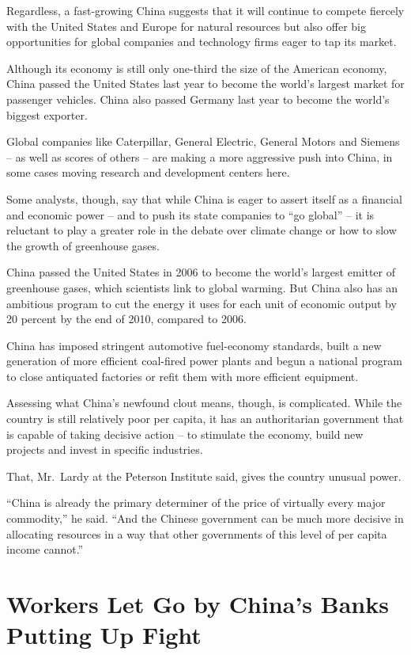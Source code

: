 ﻿\documentclass[12pt]{article}
\begin{document}
Regardless, a fast-growing China suggests that it will continue to compete fiercely with the United
States and Europe for natural resources but also offer big opportunities for global companies and
technology firms eager to tap its market.

Although its economy is still only one-third the size of the American economy, China passed the
United States last year to become the world's largest market for passenger vehicles. China also
passed Germany last year to become the world's biggest exporter.

Global companies like Caterpillar, General Electric, General Motors and Siemens -- as well as scores
of others -- are making a more aggressive push into China, in some cases moving research and
development centers here.

Some analysts, though, say that while China is eager to assert itself as a financial and economic
power -- and to push its state companies to ``go global'' -- it is reluctant to play a greater role
in the debate over climate change or how to slow the growth of greenhouse gases.

China passed the United States in 2006 to become the world's largest emitter of greenhouse gases,
which scientists link to global warming. But China also has an ambitious program to cut the energy
it uses for each unit of economic output by 20 percent by the end of 2010, compared to 2006.

China has imposed stringent automotive fuel-economy standards, built a new generation of more
efficient coal-fired power plants and begun a national program to close antiquated factories or
refit them with more efficient equipment.

Assessing what China's newfound clout means, though, is complicated. While the country is still
relatively poor per capita, it has an authoritarian government that is capable of taking decisive
action -- to stimulate the economy, build new projects and invest in specific industries.

That, Mr.~Lardy at the Peterson Institute said, gives the country unusual power.

``China is already the primary determiner of the price of virtually every major commodity,'' he
said. ``And the Chinese government can be much more decisive in allocating resources in a way that
other governments of this level of per capita income cannot.''

\section{Workers Let Go by China's Banks Putting Up Fight}
\end{document}
